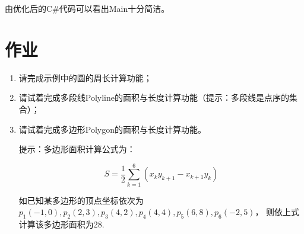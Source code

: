 

由优化后的C\#代码可以看出Main十分简洁。

\section{作业}
\begin{enumerate}
\item 请完成示例中的圆的周长计算功能；
\item 请试着完成多段线Polyline的面积与长度计算功能（提示：多段线是点序的集合）；
\item 请试着完成多边形Polygon的面积与长度计算功能。

提示：多边形面积计算公式为：

$$S=\frac{1}{2}\sum_{k=1}^{6}{(x_k y_{k+1} - x_{k+1} y_k)}$$

如已知某多边形的顶点坐标依次为
$p_1(-1,0), p_2(2,3), p_3(4,2), p_4(4,4),p_5(6,8),p_6(-2,5)$，
则依上式计算该多边形面积为28.
\end{enumerate}
